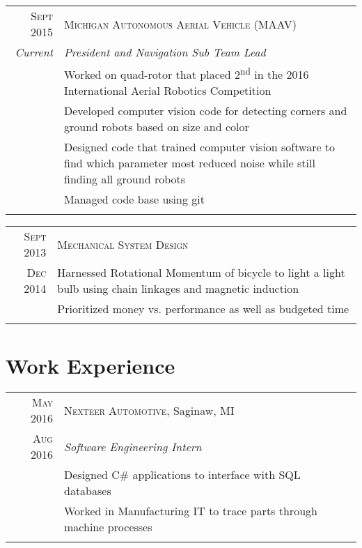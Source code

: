 \documentclass[a4paper,10pt]{article} %
\begin{document}
\begin{tabular}{r|p{13cm}}
\textsc{Sept 2015} & \textsc{Michigan Autonomous Aerial Vehicle (MAAV)} \\
\emph{Current} & \emph{President and Navigation Sub Team Lead} \\
& \footnotesize{Worked on quad-rotor that placed 2\textsuperscript{nd} in the
  2016 International Aerial Robotics Competition} \\
& \footnotesize{Developed computer vision code for detecting corners and
  ground robots based on size and color} \\
& \footnotesize{Designed code that trained computer vision software to find
  which parameter most reduced noise while still finding all ground robots} \\
& \footnotesize{Managed code base using git} \\
\multicolumn{2}{c}{} \\
\end{tabular}


\begin{tabular}{r|p{13cm}}
\textsc{Sept 2013} & \textsc{Mechanical System Design} \\
\textsc{Dec 2014} & \footnotesize{Harnessed Rotational Momentum of bicycle to
  light a light bulb using chain linkages and magnetic induction} \\
& \footnotesize{Prioritized money vs. performance as well as budgeted time} \\
\multicolumn{2}{c}{} \\
\end{tabular}


\section{Work Experience}

\begin{tabular}{r|p{13cm}}
\textsc{May 2016} & \textsc{Nexteer Automotive}, Saginaw, MI \\
\textsc{Aug 2016} & \emph{Software Engineering Intern} \\
& \footnotesize{Designed C\# applications to interface with SQL databases} \\
& \footnotesize{Worked in Manufacturing IT to trace parts through machine processes} \\
\multicolumn{2}{c}{} \\
\end{tabular}
\end{document}
